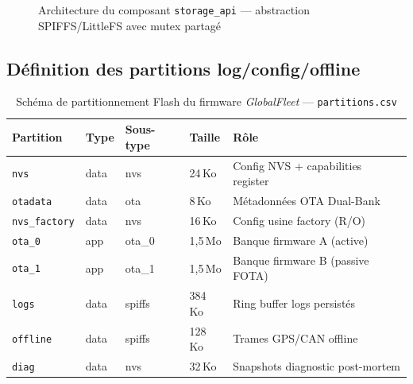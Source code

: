 \begin{figure}[H]
\centering
{}
\caption{Architecture du composant \texttt{storage\_api} --- abstraction SPIFFS/LittleFS avec mutex partagé}
\label{fig:storage_api}
\end{figure}

\subsection{Définition des partitions log/config/offline}
\label{subsec:storage_parts}

\begin{table}[H]
\centering
\renewcommand{\arraystretch}{1.6}
\caption{Schéma de partitionnement Flash du firmware \textit{GlobalFleet} --- \texttt{partitions.csv}}
\label{tab:partitions}
\small
\begin{tabular}{|p{2.8cm}|p{1.6cm}|p{1.6cm}|p{1.4cm}|p{3.5cm}|}
\hline
\rowcolor{gray!20}
\textbf{Partition} & \textbf{Type} & \textbf{Sous-type} & \textbf{Taille} & \textbf{Rôle} \\
\hline
\texttt{nvs}         & data & nvs    & 24\,Ko   & Config NVS + capabilities register \\
\hline
\texttt{otadata}     & data & ota    & 8\,Ko    & Métadonnées OTA Dual-Bank \\
\hline
\texttt{nvs\_factory}& data & nvs    & 16\,Ko   & Config usine factory (R/O) \\
\hline
\texttt{ota\_0}      & app  & ota\_0 & 1,5\,Mo  & Banque firmware A (active) \\
\hline
\texttt{ota\_1}      & app  & ota\_1 & 1,5\,Mo  & Banque firmware B (passive FOTA) \\
\hline
\texttt{logs}        & data & spiffs & 384\,Ko  & Ring buffer logs persistés \\
\hline
\texttt{offline}     & data & spiffs & 128\,Ko  & Trames GPS/CAN offline \\
\hline
\texttt{diag}        & data & nvs    & 32\,Ko   & Snapshots diagnostic post-mortem \\
\hline
\end{tabular}
\end{table}

